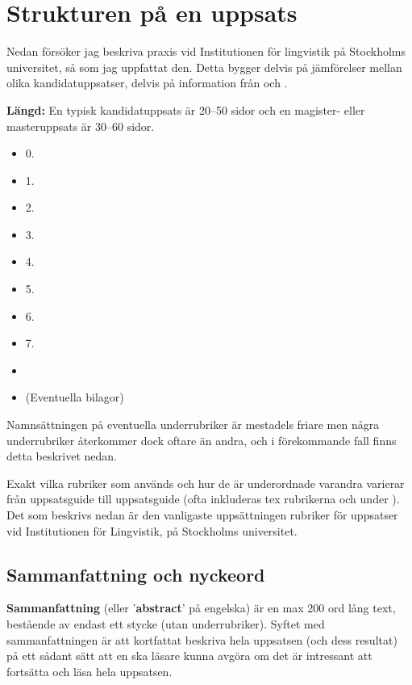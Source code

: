 
\section{Strukturen på en uppsats}
\label{struktur}

Nedan försöker jag beskriva praxis vid Institutionen för lingvistik på
Stockholms universitet, så som jag uppfattat den. Detta bygger delvis på
jämförelser mellan olika kandidatuppsatser, delvis på information från
\citet{schott+others-2007, wiren-2020} och \citet{uppsatsguide-2020}.

\textbf{Längd:} En typisk kandidatuppsats är 20--50 sidor och en magister-
eller masteruppsats är 30--60 sidor.

\begin{itemize}
\item0. 
\item1. 
\item2. 
\item3. 
\item4. 
\item5. 
\item6. 
\item7. 
\item{}
\item (Eventuella bilagor)
\end{itemize}

\noindent Namnsättningen på eventuella underrubriker är mestadels friare men
några underrubriker återkommer dock oftare än andra, och i förekommande fall
finns detta beskrivet nedan.

Exakt vilka rubriker som används och hur de är underordnade varandra varierar
från uppsatsguide till uppsatsguide (ofta inkluderas tex rubrikerna
\emph{} och \emph{} under
\emph{}). Det som beskrivs nedan är den vanligaste
uppsättningen rubriker för uppsatser vid Institutionen för Lingvistik, på
Stockholms universitet.


\setcounter{subsection}{-1}%
\subsection{Sammanfattning och nyckeord}
\label{rubrik.sammanfattning}

\textbf{Sammanfattning} (eller '\textbf{abstract}' på engelska) är en max 200
ord lång text, bestående av endast ett stycke (utan underrubriker). Syftet med
sammanfattningen är att kortfattat beskriva hela uppsatsen (och dess resultat)
på ett sådant sätt att en ska läsare kunna avgöra om det är intressant att
fortsätta och läsa hela uppsatsen.

